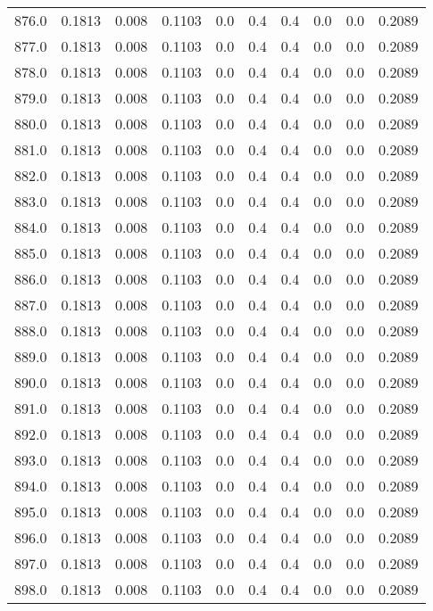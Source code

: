 \begin{longtable}{lrrrrrrrrr}
876.0 & 0.1813 & 0.008 & 0.1103 & 0.0 & 0.4 & 0.4 & 0.0 & 0.0 & 0.2089 \\
877.0 & 0.1813 & 0.008 & 0.1103 & 0.0 & 0.4 & 0.4 & 0.0 & 0.0 & 0.2089 \\
878.0 & 0.1813 & 0.008 & 0.1103 & 0.0 & 0.4 & 0.4 & 0.0 & 0.0 & 0.2089 \\
879.0 & 0.1813 & 0.008 & 0.1103 & 0.0 & 0.4 & 0.4 & 0.0 & 0.0 & 0.2089 \\
880.0 & 0.1813 & 0.008 & 0.1103 & 0.0 & 0.4 & 0.4 & 0.0 & 0.0 & 0.2089 \\
881.0 & 0.1813 & 0.008 & 0.1103 & 0.0 & 0.4 & 0.4 & 0.0 & 0.0 & 0.2089 \\
882.0 & 0.1813 & 0.008 & 0.1103 & 0.0 & 0.4 & 0.4 & 0.0 & 0.0 & 0.2089 \\
883.0 & 0.1813 & 0.008 & 0.1103 & 0.0 & 0.4 & 0.4 & 0.0 & 0.0 & 0.2089 \\
884.0 & 0.1813 & 0.008 & 0.1103 & 0.0 & 0.4 & 0.4 & 0.0 & 0.0 & 0.2089 \\
885.0 & 0.1813 & 0.008 & 0.1103 & 0.0 & 0.4 & 0.4 & 0.0 & 0.0 & 0.2089 \\
886.0 & 0.1813 & 0.008 & 0.1103 & 0.0 & 0.4 & 0.4 & 0.0 & 0.0 & 0.2089 \\
887.0 & 0.1813 & 0.008 & 0.1103 & 0.0 & 0.4 & 0.4 & 0.0 & 0.0 & 0.2089 \\
888.0 & 0.1813 & 0.008 & 0.1103 & 0.0 & 0.4 & 0.4 & 0.0 & 0.0 & 0.2089 \\
889.0 & 0.1813 & 0.008 & 0.1103 & 0.0 & 0.4 & 0.4 & 0.0 & 0.0 & 0.2089 \\
890.0 & 0.1813 & 0.008 & 0.1103 & 0.0 & 0.4 & 0.4 & 0.0 & 0.0 & 0.2089 \\
891.0 & 0.1813 & 0.008 & 0.1103 & 0.0 & 0.4 & 0.4 & 0.0 & 0.0 & 0.2089 \\
892.0 & 0.1813 & 0.008 & 0.1103 & 0.0 & 0.4 & 0.4 & 0.0 & 0.0 & 0.2089 \\
893.0 & 0.1813 & 0.008 & 0.1103 & 0.0 & 0.4 & 0.4 & 0.0 & 0.0 & 0.2089 \\
894.0 & 0.1813 & 0.008 & 0.1103 & 0.0 & 0.4 & 0.4 & 0.0 & 0.0 & 0.2089 \\
895.0 & 0.1813 & 0.008 & 0.1103 & 0.0 & 0.4 & 0.4 & 0.0 & 0.0 & 0.2089 \\
896.0 & 0.1813 & 0.008 & 0.1103 & 0.0 & 0.4 & 0.4 & 0.0 & 0.0 & 0.2089 \\
897.0 & 0.1813 & 0.008 & 0.1103 & 0.0 & 0.4 & 0.4 & 0.0 & 0.0 & 0.2089 \\
898.0 & 0.1813 & 0.008 & 0.1103 & 0.0 & 0.4 & 0.4 & 0.0 & 0.0 & 0.2089 \\

\end{longtable}
